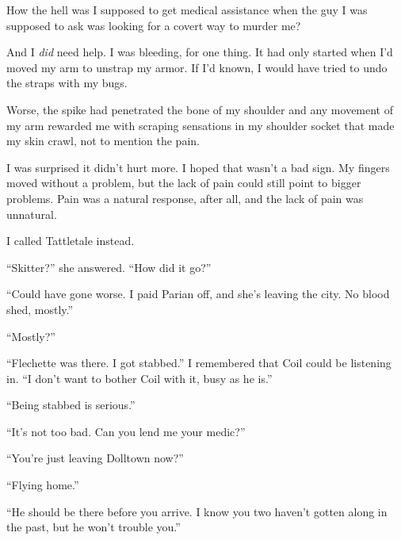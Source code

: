 





How the hell was I supposed to get medical assistance when the guy I was supposed to ask was looking for a covert way to murder me?



And I \emph{did} need help.  I was bleeding, for one thing.  It had only started when I'd moved my arm to unstrap my armor.  If I'd known, I would have tried to undo the straps with my bugs.



Worse, the spike had penetrated the bone of my shoulder and any movement of my arm rewarded me with scraping sensations in my shoulder socket that made my skin crawl, not to mention the pain.



I was surprised it didn't hurt more.  I hoped that wasn't a bad sign.  My fingers moved without a problem, but the lack of pain could still point to bigger problems.  Pain was a natural response, after all, and the lack of pain was unnatural.



I called Tattletale instead.



``Skitter?'' she answered.  ``How did it go?''



``Could have gone worse.  I paid Parian off, and she's leaving the city.  No blood shed, mostly.''



``Mostly?''



``Flechette was there.  I got stabbed.'' I remembered that Coil could be listening in.  ``I don't want to bother Coil with it, busy as he is.''



``Being stabbed is serious.''



``It's not too bad.  Can you lend me your medic?''



``You're just leaving Dolltown now?''



``Flying home.''



``He should be there before you arrive.  I know you two haven't gotten along in the past, but he won't trouble you.''



